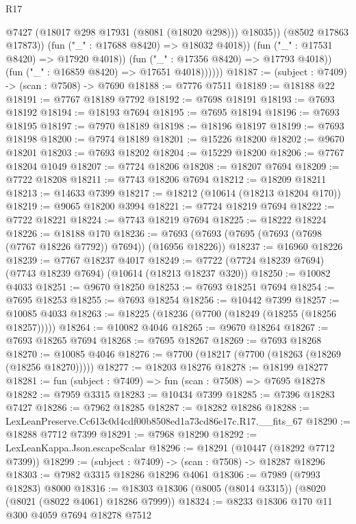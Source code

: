 \begin{lexlean}{R17}
\begin{coremodule}
                          @7427
                          (@18017 @298 @17931 (@8081 (@18020 @298)))
                          @18035))
                      (@8502 @17863 @17873))
                    (fun ("_" : @17688 @8420) => @18032 @4018))
                  (fun ("_" : @17531 @8420) => @17920 @4018))
                (fun ("_" : @17356 @8420) => @17793 @4018))
              (fun ("_" : @16859 @8420) => @17651 @4018))))))
@18187 := (subject : @7409) -> (scan : @7508) -> @7690
@18188 := @7776 @7511
@18189 := @18188 @22
@18191 := @7767 @18189 @7792
@18192 := @7698 @18191
@18193 := @7693 @18192
@18194 := @18193 @7694
@18195 := @7695 @18194
@18196 := @7693 @18195
@18197 := @7970 @18189
@18198 := @18196 @18197
@18199 := @7693 @18198
@18200 := @7974 @18189
@18201 := @15226 @18200
@18202 := @9670 @18201
@18203 := @7693 @18202
@18204 := @15229 @18200
@18206 := @7767 @18204 @1049
@18207 := @7724 @18206
@18208 := @18207 @7694
@18209 := @7722 @18208
@18211 := @7743 @18206 @7694
@18212 := @18209 @18211
@18213 := @14633 @7399
@18217 := @18212 (@10614 (@18213 @18204 @170))
@18219 := @9065 @18200 @3994
@18221 := @7724 @18219 @7694
@18222 := @7722 @18221
@18224 := @7743 @18219 @7694
@18225 := @18222 @18224
@18226 := @18188 @170
@18236 := @7693 (@7693 (@7695 (@7693 (@7698 (@7767 @18226 @7792)) @7694)) (@16956 @18226))
@18237 := @16960 @18226
@18239 := @7767 @18237 @4017
@18249 := @7722 (@7724 @18239 @7694) (@7743 @18239 @7694) (@10614 (@18213 @18237 @320))
@18250 := @10082 @4033
@18251 := @9670 @18250
@18253 := @7693 @18251 @7694
@18254 := @7695 @18253
@18255 := @7693 @18254
@18256 := @10442 @7399
@18257 := @10085 @4033
@18263 := @18225 (@18236 (@7700 (@18249 (@18255 (@18256 @18257)))))
@18264 := @10082 @4046
@18265 := @9670 @18264
@18267 := @7693 @18265 @7694
@18268 := @7695 @18267
@18269 := @7693 @18268
@18270 := @10085 @4046
@18276 := @7700 (@18217 (@7700 (@18263 (@18269 (@18256 @18270)))))
@18277 := @18203 @18276
@18278 := @18199 @18277
@18281 := fun (subject : @7409) => fun (scan : @7508) => @7695 @18278
@18282 := @7959 @3315
@18283 := @10434 @7399
@18285 := @7396 @18283 @7427
@18286 := @7962 @18285
@18287 := @18282 @18286
@18288 := LexLeanPreserve.Cc613c0d4cdf00b8508ed1a73cd86e17c.R17.__fits_67
@18290 := @18288 @7712 @7399
@18291 := @7968 @18290
@18292 := LexLeanKappa.Json.escapeScalar
@18296 := @18291 (@10447 (@18292 @7712 @7399))
@18299 := (subject : @7409) -> (scan : @7508) -> @18287 @18296
@18303 := @7982 @3315 @18286 @18296 @4061
@18306 := @7989 (@7993 @18283) @8000
@18316 := @18303 @18306 (@8005 (@8014 @3315)) (@8020 (@8021 (@8022 @4061) @18286 @7999))
@18324 := @8233 @18306 @170 @11 @300 @4059 @7694 @18278 @7512

\end{coremodule}
\end{lexlean}
